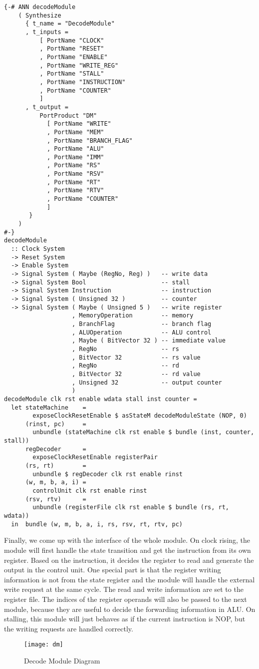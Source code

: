 \begin{verbatim}
{-# ANN decodeModule
    ( Synthesize
      { t_name = "DecodeModule"
      , t_inputs =
          [ PortName "CLOCK"
          , PortName "RESET"
          , PortName "ENABLE"
          , PortName "WRITE_REG"
          , PortName "STALL"
          , PortName "INSTRUCTION"
          , PortName "COUNTER"
          ]
      , t_output =
          PortProduct "DM"
            [ PortName "WRITE"
            , PortName "MEM"
            , PortName "BRANCH_FLAG"
            , PortName "ALU"
            , PortName "IMM"
            , PortName "RS"
            , PortName "RSV"
            , PortName "RT"
            , PortName "RTV"
            , PortName "COUNTER"
            ]
       }
    )
#-}
decodeModule 
  :: Clock System
  -> Reset System
  -> Enable System
  -> Signal System ( Maybe (RegNo, Reg) )   -- write data
  -> Signal System Bool                     -- stall
  -> Signal System Instruction              -- instruction
  -> Signal System ( Unsigned 32 )          -- counter
  -> Signal System ( Maybe ( Unsigned 5 )   -- write register
                   , MemoryOperation        -- memory
                   , BranchFlag             -- branch flag
                   , ALUOperation           -- ALU control
                   , Maybe ( BitVector 32 ) -- immediate value
                   , RegNo                  -- rs
                   , BitVector 32           -- rs value
                   , RegNo                  -- rd
                   , BitVector 32           -- rd value
                   , Unsigned 32            -- output counter
                   )
decodeModule clk rst enable wdata stall inst counter =
  let stateMachine    =
        exposeClockResetEnable $ asStateM decodeModuleState (NOP, 0)
      (rinst, pc)     =
        unbundle (stateMachine clk rst enable $ bundle (inst, counter, stall))
      regDecoder      = 
        exposeClockResetEnable registerPair
      (rs, rt)        = 
        unbundle $ regDecoder clk rst enable rinst
      (w, m, b, a, i) = 
        controlUnit clk rst enable rinst
      (rsv, rtv)      =
        unbundle (registerFile clk rst enable $ bundle (rs, rt, wdata))
  in  bundle (w, m, b, a, i, rs, rsv, rt, rtv, pc)
\end{verbatim}
Finally, we come up with the interface of the whole module. On clock rising, the module will first handle the state transition and get the instruction from its own register. Based on the instruction, it decides the register to read and generate the output in the control unit. One special part is that the register writing information is not from the state register and the module will handle the external write request at the same cycle. The read and write information are set to the register file. The indices of the register operands will also be passed to the next module, because they are useful to decide the forwarding information in ALU. On stalling, this module will just behaves as if the current instruction is NOP, but the writing requests are handled correctly.
\begin{figure}[H]
	\centering
	\texttt{[image: dm]}
	\caption{Decode Module Diagram}
\end{figure}
